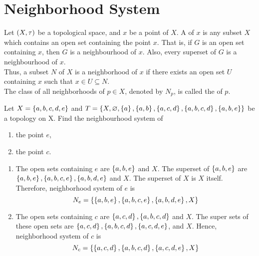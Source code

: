 \documentclass[../main-sheet.tex]{subfiles}
\begin{document}
\section{Neighborhood System}
\begin{defn}
    Let  \((X, \tau)\) be a topological space, and  \(x\) be a point of  \(X\). A  of  \(x\) is any subset  \(X\) which contains an open set containing the point  \(x\). That is, if  \(G\) is an open set containing  \(x\), then  \(G\) is a neighbourhood of  \(x\). Also, every superset of  \(G\) is a neighbourhood of  \(x\).\\
    Thus, a subset  \(N\) of  \(X\) is a neighborhood of  \(x\) if there exists an
    open set  \(U\) containing  \(x\) such that  \(x \in U \subseteq N\).\\
    The class of all neighborhoods of  \(p \in X\), denoted by  \(N_p\), is called the  of  \(p\).
\end{defn}
\begin{ex}
    
Let  \(X = \left\{a, b, c, d, e\right\}\) and  \(T = \left\{X, \varnothing, \left\{a\right\}, \left\{a,b\right\}, \left\{a, c, d\right\}, \left\{a,b,c,d\right\}, \left\{a,b,e\right\}\right\}\)
be a topology on X.
Find the neighbourhood system of 
\begin{enumerate}[label=(\roman*)]
    \item the point  \(e\),
    \item the point  \(c\).
\end{enumerate}
\end{ex}
\begin{soln}
    \hfill
    \begin{enumerate}[label=(\roman*)]
        \item The open sets containing  \(e\) are  \(\left\{a,b, e\right\}\) and  \(X\). The superset of  \(\left\{a, b, e\right\}\) are  \(\left\{a,b, e\right\}, \left\{a, b, c, e\right\}, \left\{a, b, d,e\right\}\) and  \(X\). The superset of  \(X\) is  \(X\) itself. Therefore, neighborhood system of  \(e\) is
        \[
            N_e =\left\{\left\{a,b, e\right\}, \left\{a, b, c, e\right\}, \left\{a, b, d, e\right\}, X\right\}
        \]
        \item The open sets containing  \(c\) are  \(\left\{a, c, d\right\}, \left\{a,b,c,d\right\}\) and  \(X\). The super sets of these open sets are  \(\left\{a,c,d\right\}, \left\{a,b,c,d\right\}, \left\{a, c, d, e\right\}\), and  \(X\). Hence, neighborhood system of  \(c\) is
        \[
            N_c= \left\{\left\{a, c, d\right\}, \left\{a, b, c, d\right\}, \left\{a, c, d, e\right\}, X\right\}
        \]
    \end{enumerate}
\end{soln}
\end{document}
